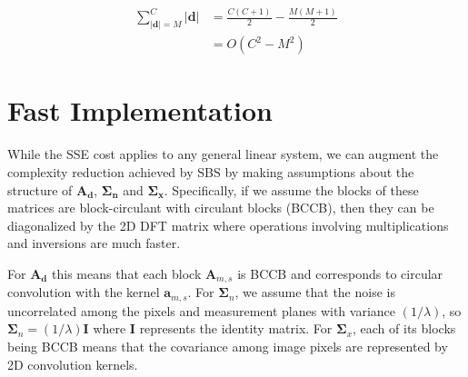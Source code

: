 \documentclass{article}
\providecommand{\norm}[1]{\left\lVert#1\right\rVert}
\DeclareMathOperator*{\argmin}{arg\,min}
\begin{document}
$$
\begin{aligned}
  \sum_{|\bm{d}| = M}^C |\bm{d}|
  &= \frac{C
    (C + 1)}{2} - \frac{M(M + 1)}{2} \\
  &= O(C^2 - M^2)
\end{aligned}
$$



\section{Fast Implementation}
While the SSE cost applies to any general linear system, we can augment the
complexity reduction achieved by SBS by making assumptions about the structure
of $\bm{A}_{\bm{d}}$, $\bm{\Sigma}_{\bm{n}}$ and $\bm{\Sigma}_{\bm{x}}$.
Specifically, if we assume the blocks of these matrices are block-circulant with
circulant blocks (BCCB), then they can be diagonalized by the 2D DFT matrix
where operations involving multiplications and inversions are much faster.

For $\bm{A}_{\bm{d}}$ this means that each block $\bm A_{m,s}$ is BCCB and
corresponds to circular convolution with the kernel $\bm a_{m,s}$. For $\bm
\Sigma_n$, we assume that the noise is uncorrelated among the pixels and
measurement planes with variance $(1/\lambda)$, so $\bm \Sigma_n=(1/\lambda) \bm
I$ where $\bm I$ represents the identity matrix. For $\bm \Sigma_x$, each of its
blocks being BCCB means that the covariance among image pixels are represented
by 2D convolution kernels.
\end{document}
